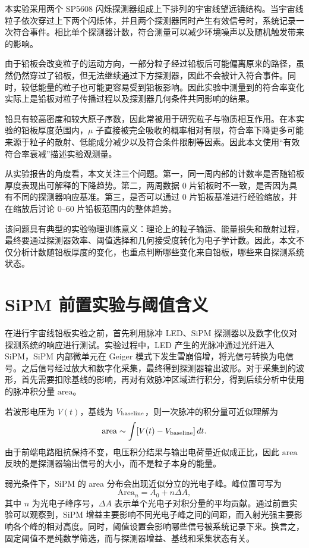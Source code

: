 \documentclass[aps,prl,twocolumn,superscriptaddress,nofootinbib]{revtex4-2}
\begin{document}
本实验采用两个 SP5608 闪烁探测器组成上下排列的宇宙线望远镜结构。当宇宙线粒子依次穿过上下两个闪烁体，并且两个探测器同时产生有效信号时，系统记录一次符合事件。相比单个探测器计数，符合测量可以减少环境噪声以及随机触发带来的影响。

由于铅板会改变粒子的运动方向，一部分粒子经过铅板后可能偏离原来的路径，虽然仍然穿过了铅板，但无法继续通过下方探测器，因此不会被计入符合事件。同时，较低能量的粒子也可能更容易受到铅板影响。因此实验中测量到的符合率变化实际上是铅板对粒子传播过程以及探测器几何条件共同影响的结果。

铅具有较高密度和较大原子序数，因此常被用于研究粒子与物质相互作用。在本实验的铅板厚度范围内，$\mu$ 子直接被完全吸收的概率相对有限，符合率下降更多可能来源于粒子的散射、低能成分减少以及符合条件限制等因素。因此本文使用“有效符合率衰减”描述实验观测量。

从实验报告的角度看，本文关注三个问题。第一，同一周内部的计数率是否随铅板厚度表现出可解释的下降趋势。第二，两周数据 0 片铅板时不一致，是否因为具有不同的探测器响应基准。第三，是否可以通过 0 片铅板基准进行经验缩放，并在缩放后讨论 0--60 片铅板范围内的整体趋势。

该问题具有典型的实验物理训练意义：理论上的粒子输运、能量损失和散射过程，最终要通过探测器效率、阈值选择和几何接受度转化为电子学计数。因此，本文不仅分析计数随铅板厚度的变化，也重点判断哪些变化来自铅板，哪些来自探测系统状态。

\section{SiPM 前置实验与阈值含义}

在进行宇宙线铅板实验之前，首先利用脉冲 LED、SiPM 探测器以及数字化仪对探测系统的响应进行测试。实验过程中，LED 产生的光脉冲通过光纤进入 SiPM，SiPM 内部微单元在 Geiger 模式下发生雪崩倍增，将光信号转换为电信号。之后信号经过放大和数字化采集，最终得到探测器输出波形。对于采集到的波形，首先需要扣除基线的影响，再对有效脉冲区域进行积分，得到后续分析中使用的脉冲积分量 \(\mathrm{area}\)。

若波形电压为 \(V(t)\)，基线为 \(V_{\rm baseline}\)，则一次脉冲的积分量可近似理解为
\begin{equation}
\mathrm{area}\sim \int [V(t)-V_{\rm baseline}]\,dt .
\end{equation}
由于前端电路阻抗保持不变，电压积分结果与输出电荷量近似成正比，因此 \(\mathrm{area}\) 反映的是探测器输出信号的大小，而不是粒子本身的能量。

弱光条件下，SiPM 的 area 分布会出现近似分立的光电子峰。峰位置可写为
\begin{equation}
\mathrm{Area}_n=A_0+n\Delta A ,
\end{equation}
其中 \(n\) 为光电子峰序号，\(\Delta A\) 表示单个光电子对积分量的平均贡献。通过前置实验可以观察到，SiPM 增益主要影响不同光电子峰之间的间距，而入射光强主要影响各个峰的相对高度。同时，阈值设置会影响哪些信号被系统记录下来。换言之，固定阈值不是纯数学筛选，而与探测器增益、基线和采集状态有关。
\end{document}
